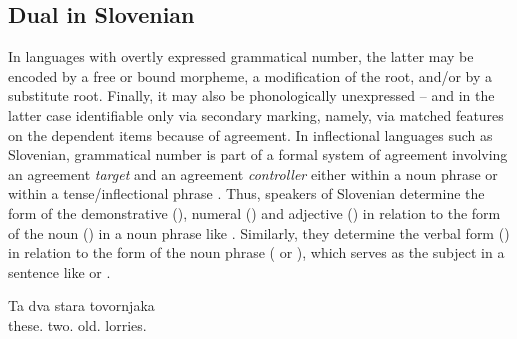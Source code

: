 \documentclass[output=paper,colorlinks,citecolor=brown]{langscibook}
\begin{document}
\subsection{Dual in Slovenian}\label{pav:sec:slovenian-dual}
In languages with overtly expressed grammatical number, the latter may be encoded by a free or bound morpheme, a modification of the root, and/or by a substitute root. Finally, it may also be phonologically unexpressed -- and in the latter case identifiable only via secondary marking, namely, via matched features on the dependent items because of agreement. In inflectional languages such as Slovenian, grammatical number is part of a formal system of agreement involving an agreement \textit{target} and an agreement \textit{controller} \citep{Corbett2000} either within a noun phrase \citep[109]{pav+:Toporisic2000} or within a tense/inflectional phrase \citep[608]{pav+:Toporisic2000}. Thus, speakers of Slovenian determine the form of the demonstrative (), numeral () and adjective () in relation to the form of the noun () in a noun phrase like . Similarly, they determine the verbal form () in relation to the form of the noun phrase ( or ), which serves as the subject in a sentence like  or . 

\ea\label{pav:ex:1}
\gll    Ta     dva    stara      tovornjaka\\
        these.{\DU}	two.{\DU}	    old.{\DU}          lorries.{\DU}\\
\glt {}
\z
		
\ea \label{pav:ex:2}
 \label{pav:ex:2a}
 \label{pav:ex:2b}
\z
\z
\end{document}
